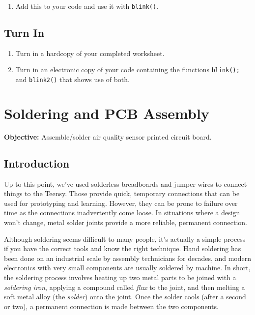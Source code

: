 \documentclass[]{book}
\providecommand{\tightlist}{%
  \setlength{\itemsep}{0pt}\setlength{\parskip}{0pt}}
\begin{document}
\begin{enumerate}
\def\labelenumi{\arabic{enumi}.}
\setcounter{enumi}{1}
\tightlist
\item
  Add this to your code and use it with \texttt{blink()}.
\end{enumerate}

\hypertarget{turn-in-2}{%
\section{Turn In}\label{turn-in-2}}

\begin{enumerate}
\def\labelenumi{\arabic{enumi}.}
\tightlist
\item
  Turn in a hardcopy of your completed worksheet.
\item
  Turn in an electronic copy of your code containing the functions \texttt{blink();} and \texttt{blink2()} that shows use of both.
\end{enumerate}

\hypertarget{soldering-and-pcb-assembly}{%
\chapter{Soldering and PCB Assembly}\label{soldering-and-pcb-assembly}}

\textbf{Objective:} Assemble/solder air quality sensor printed circuit board.

\hypertarget{introduction-4}{%
\section{Introduction}\label{introduction-4}}

Up to this point, we've used solderless breadboards and jumper wires to connect things to the Teensy. Those provide quick, temporary connections that can be used for prototyping and learning. However, they can be prone to failure over time as the connections inadvertently come loose. In situations where a design won't change, metal solder joints provide a more reliable, permanent connection.

Although soldering seems difficult to many people, it's actually a simple process if you have the correct tools and know the right technique. Hand soldering has been done on an industrial scale by assembly technicians for decades, and modern electronics with very small components are usually soldered by machine. In short, the soldering process involves heating up two metal parts to be joined with a \emph{soldering iron}, applying a compound called \emph{flux} to the joint, and then melting a soft metal alloy (the \emph{solder}) onto the joint. Once the solder cools (after a second or two), a permanent connection is made between the two components.
\end{document}
